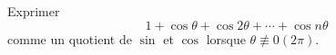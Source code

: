 Exprimer
\[1+\cos \theta + \cos 2\theta + \cdots + \cos n\theta\]
comme un quotient de $\sin$ et $\cos$ lorsque $\theta \not \equiv 0 (2\pi)$.
\bigskip\bigskip